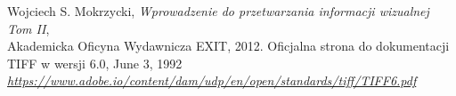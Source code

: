 \documentclass[magisterska,openany]{pracadypl}
\begin{document}
\listoffigures
{}

\begin{thebibliography}{7}
%
Wojciech S. Mokrzycki, 
\textit{Wprowadzenie do przetwarzania informacji wizualnej Tom II}, 
\\Akademicka Oficyna Wydawnicza EXIT, 2012.
%
Oficjalna strona do dokumentacji TIFF w wersji 6.0, June 3, 1992
\\\textit{\url{https://www.adobe.io/content/dam/udp/en/open/standards/tiff/TIFF6.pdf}}
%
\end{thebibliography}
\end{document}
